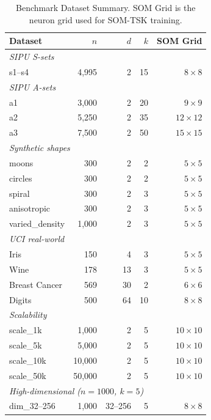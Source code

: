 \documentclass[journal]{IEEEtran}
\begin{document}
\begin{table}[!t]
\caption{Benchmark Dataset Summary. SOM Grid is the neuron grid used for SOM-TSK training.}
\label{tab:datasets}
\centering
\renewcommand{\arraystretch}{1.05}
\small
\begin{tabular}{lrrrr}
\toprule
Dataset & $n$ & $d$ & $k$ & SOM Grid \\
\midrule
\multicolumn{5}{l}{\textit{SIPU S-sets}} \\
s1--s4 & 4,995 & 2 & 15 & $8{\times}8$ \\
\multicolumn{5}{l}{\textit{SIPU A-sets}} \\
a1 & 3,000 & 2 & 20 & $9{\times}9$  \\
a2 & 5,250 & 2 & 35 & $12{\times}12$ \\
a3 & 7,500 & 2 & 50 & $15{\times}15$ \\
\multicolumn{5}{l}{\textit{Synthetic shapes}} \\
moons      & 300   & 2 &  2 & $5{\times}5$ \\
circles    & 300   & 2 &  2 & $5{\times}5$ \\
spiral     & 300   & 2 &  3 & $5{\times}5$ \\
anisotropic & 300  & 2 &  3 & $5{\times}5$ \\
varied\_density & 1,000 & 2 & 3 & $5{\times}5$ \\
\multicolumn{5}{l}{\textit{UCI real-world}} \\
Iris         & 150   &  4 &  3 & $5{\times}5$ \\
Wine         & 178   & 13 &  3 & $5{\times}5$ \\
Breast Cancer & 569  & 30 &  2 & $6{\times}6$ \\
Digits       & 500   & 64 & 10 & $8{\times}8$ \\
\multicolumn{5}{l}{\textit{Scalability}} \\
scale\_1k  &  1,000 & 2 & 5 & $10{\times}10$ \\
scale\_5k  &  5,000 & 2 & 5 & $10{\times}10$ \\
scale\_10k & 10,000 & 2 & 5 & $10{\times}10$ \\
scale\_50k & 50,000 & 2 & 5 & $10{\times}10$ \\
\multicolumn{5}{l}{\textit{High-dimensional ($n=1000$, $k=5$)}} \\
dim\_32--256 & 1,000 & 32--256 & 5 & $8{\times}8$ \\
\bottomrule
\end{tabular}
\end{table}
\end{document}
